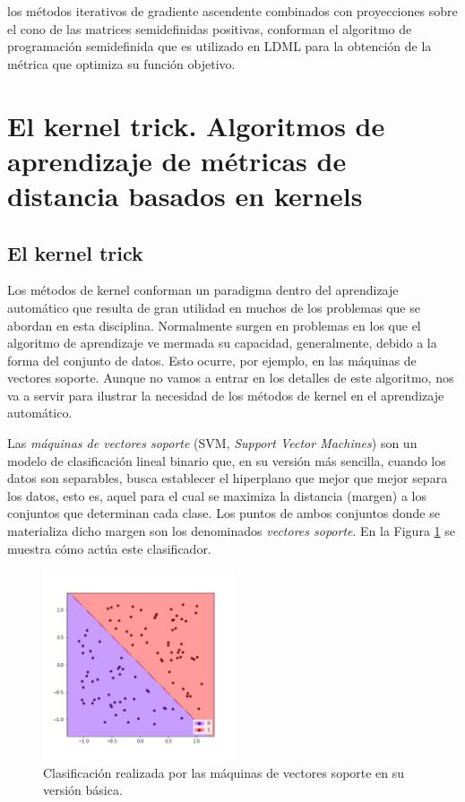los métodos iterativos de gradiente ascendente combinados con proyecciones sobre el cono de las matrices semidefinidas positivas, conforman el algoritmo de programación semidefinida que es utilizado en LDML para la obtención de la métrica que optimiza su función objetivo.




\section{El kernel trick. Algoritmos de aprendizaje de métricas de distancia basados en kernels}

\subsection{El kernel trick}

Los métodos de kernel conforman un paradigma dentro del aprendizaje automático que resulta de gran utilidad en muchos de los problemas que se abordan en esta disciplina. Normalmente surgen en problemas en los que el algoritmo de aprendizaje ve mermada su capacidad, generalmente, debido a la forma del conjunto de datos. Esto ocurre, por ejemplo, en las máquinas de vectores soporte. Aunque no vamos a entrar en los detalles de este algoritmo, nos va a servir para ilustrar la necesidad de los métodos de kernel en el aprendizaje automático.

Las \emph{máquinas de vectores soporte} (SVM, \emph{Support Vector Machines}) son un modelo de clasificación lineal binario que, en su versión más sencilla, cuando los datos son separables, busca establecer el hiperplano que mejor que mejor separa los datos, esto es, aquel para el cual se maximiza la distancia (margen) a los conjuntos que determinan cada clase. Los puntos de ambos conjuntos donde se materializa dicho margen son los denominados \emph{vectores soporte}. En la Figura \ref{fig:svm_ejemplo} se muestra cómo actúa este clasificador.

\begin{figure}[h]
    \centering
    \includegraphics[width=0.5\textwidth]{images/svm_example.png}
    \caption{Clasificación realizada por las máquinas de vectores soporte en su versión básica.} \label{fig:svm_ejemplo}
\end{figure} 

